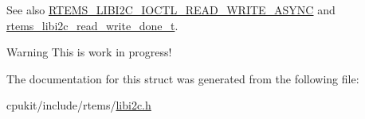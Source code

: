 \begin{DoxySeeAlso}{See also}
\mbox{\hyperlink{group__libi2c_gadae8be7dedd12dba0ca853f7f041fc1b}{R\+T\+E\+M\+S\+\_\+\+L\+I\+B\+I2\+C\+\_\+\+I\+O\+C\+T\+L\+\_\+\+R\+E\+A\+D\+\_\+\+W\+R\+I\+T\+E\+\_\+\+A\+S\+Y\+NC}} and \mbox{\hyperlink{group__libi2c_gae9d3e463bdcf351a6d40952c9c57446c}{rtems\+\_\+libi2c\+\_\+read\+\_\+write\+\_\+done\+\_\+t}}.
\end{DoxySeeAlso}
\begin{DoxyWarning}{Warning}
This is work in progress! 
\end{DoxyWarning}


The documentation for this struct was generated from the following file\+:\begin{DoxyCompactItemize}
\item 
cpukit/include/rtems/\mbox{\hyperlink{libi2c_8h}{libi2c.\+h}}\end{DoxyCompactItemize}
